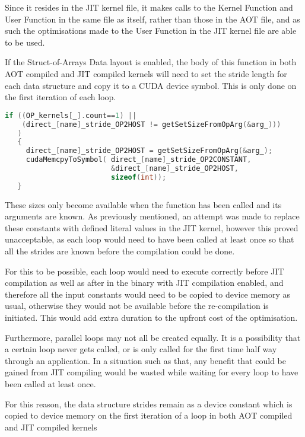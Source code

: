 \noindent Since it resides in the JIT kernel file, it makes calls to the Kernel Function and User Function in the same file as itself, rather than those in the AOT file, and as such the optimisations made to the User Function in the JIT kernel file are able to be used.

If the Struct-of-Arrays Data layout is enabled, the body of this function in both AOT compiled and JIT compiled kernels will need to set the stride length for each data structure and copy it to a CUDA device symbol. This is only done on the first iteration of each loop.
\begin{lstlisting}[linewidth = \textwidth, framesep=0pt,escapechar=:, language=C,backgroundcolor=\color{red!20}]
if ((OP_kernels[_].count==1) ||
    (direct_[name]_stride_OP2HOST != getSetSizeFromOpArg(&arg_)))
   )
   {
     direct_[name]_stride_OP2HOST = getSetSizeFromOpArg(&arg_);
     cudaMemcpyToSymbol( direct_[name]_stride_OP2CONSTANT,
                         &direct_[name]_stride_OP2HOST,
                         sizeof(int));
   }
\end{lstlisting}


\noindent These sizes only become available when the function has been called and its arguments are known. As previously mentioned, an attempt was made to replace these constants with defined literal values in the JIT kernel, however this proved unacceptable, as each loop would need to have been called at least once so that all the strides are known before the compilation could be done.
\par
For this to be possible, each loop would need to execute correctly before JIT compilation as well as after in the binary with JIT compilation enabled, and therefore all the input constants would need to be copied to device memory as usual, otherwise they would not be available before the re-compilation is initiated. This would add extra duration to the upfront cost of the optimisation.\par
Furthermore, parallel loops may not all be created equally. It is a possibility that a certain loop never gets called, or is only called for the first time half way through an application. In a situation such as that, any benefit that could be gained from JIT compiling would be wasted while waiting for every loop to have been called at least once.
\par
For this reason, the data structure strides remain as a device constant which is copied to device memory on the first iteration of a loop in both AOT compiled and JIT compiled kernels

